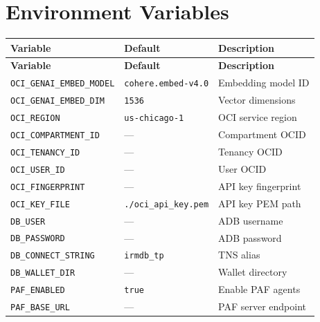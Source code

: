 \documentclass[12pt,a4paper]{article}
\begin{document}
\section{Environment Variables}
\label{app:env}

\begin{longtable}{p{5cm} p{3cm} p{5.5cm}}
\toprule
\textbf{Variable} & \textbf{Default} & \textbf{Description} \\
\midrule
\endfirsthead
\toprule
\textbf{Variable} & \textbf{Default} & \textbf{Description} \\
\midrule
\endhead
\texttt{OCI\_GENAI\_EMBED\_MODEL} & \texttt{cohere.embed-v4.0} & Embedding model ID \\
\texttt{OCI\_GENAI\_EMBED\_DIM} & \texttt{1536} & Vector dimensions \\
\texttt{OCI\_REGION} & \texttt{us-chicago-1} & OCI service region \\
\texttt{OCI\_COMPARTMENT\_ID} & — & Compartment OCID \\
\texttt{OCI\_TENANCY\_ID} & — & Tenancy OCID \\
\texttt{OCI\_USER\_ID} & — & User OCID \\
\texttt{OCI\_FINGERPRINT} & — & API key fingerprint \\
\texttt{OCI\_KEY\_FILE} & \texttt{./oci\_api\_key.pem} & API key PEM path \\
\texttt{DB\_USER} & — & ADB username \\
\texttt{DB\_PASSWORD} & — & ADB password \\
\texttt{DB\_CONNECT\_STRING} & \texttt{irmdb\_tp} & TNS alias \\
\texttt{DB\_WALLET\_DIR} & — & Wallet directory \\
\texttt{PAF\_ENABLED} & \texttt{true} & Enable PAF agents \\
\texttt{PAF\_BASE\_URL} & — & PAF server endpoint \\
\bottomrule
\end{longtable}
\end{document}
